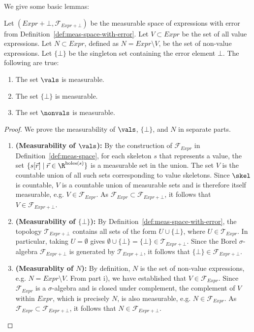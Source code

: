 We give some basic lemmas:
\begin{lemma}
	Let $(Expr + \bot, \mathcal{F}_{Expr + \bot})$ be the measurable space of expressions with error from Definition~\ref{def:meas-space-with-error}. Let $V \subset Expr$ be the set of all value expressions. Let $N \subset Expr$, defined as $N = Expr \setminus V$, be the set of non-value expressions. Let $\{\bot\}$ be the singleton set containing the error element $\bot$. The following are true:
	\begin{enumerate}
		\item The set $\vals$ is measurable.
		\item The set $\{\bot\}$ is measurable.
		\item The set $\nonvals$ is measurable.
	\end{enumerate}
\end{lemma}

\begin{proof}
	We prove the measurability of $\vals$, $\{\bot\}$, and $N$ in separate parts.
	\begin{enumerate}
		\item \textbf{(Measurability of $\vals$):} By the construction of $\mathcal{F}_{Expr}$ in Definition~\ref{def:meas-space}, for each skeleton $s$ that represents a value, the set $\{s[\vec{r}] \mid \vec{r} \in \R^{\text{holes}(s)}\}$ is a measurable set in the union. The set $V$ is the countable union of all such sets corresponding to value skeletons. Since $\skel$ is countable, $V$ is a countable union of measurable sets and is therefore itself measurable, e.g. $V \in \mathcal{F}_{Expr}$. As $\mathcal{F}_{Expr} \subset \mathcal{F}_{Expr + \bot}$, it follows that $V \in \mathcal{F}_{Expr + \bot}$.
		
		\item \textbf{(Measurability of $\{\bot\}$):} By Definition~\ref{def:meas-space-with-error}, the topology $\mathcal{T}_{Expr + \bot}$ contains all sets of the form $U \cup \{\bot\}$, where $U \in \mathcal{T}_{Expr}$. In particular, taking $U = \emptyset$ gives $\emptyset \cup \{\bot\} = \{\bot\} \in \mathcal{T}_{Expr + \bot}$. Since the Borel $\sigma$-algebra $\mathcal{F}_{Expr + \bot}$ is generated by $\mathcal{T}_{Expr + \bot}$, it follows that $\{\bot\} \in \mathcal{F}_{Expr + \bot}$.

		\item \textbf{(Measurablity of $N$):} By definition, $N$ is the set of non-value expressions, e.g. $N = Expr \setminus V$. From part i), we have established that $V \in \mathcal{F}_{Expr}$. Since $\mathcal{F}_{Expr}$ is a $\sigma$-algebra and is closed under complement, the complement of $V$ within $Expr$, which is precisely $N$, is also measurable, e.g. $N \in \mathcal{F}_{Expr}$. As $\mathcal{F}_{Expr} \subset \mathcal{F}_{Expr + \bot}$, it follows that $N \in \mathcal{F}_{Expr + \bot}$.
	\end{enumerate}
\end{proof}


